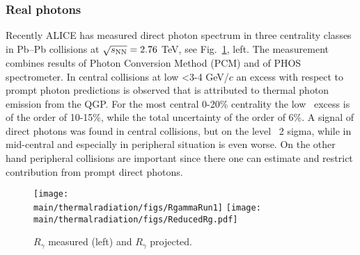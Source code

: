 \subsubsection{Real photons}

Recently ALICE has measured direct photon spectrum in three centrality classes in Pb--Pb collisions at $\sqrt{s_{\rm NN}}=2.76$ TeV, see Fig.\ \ref{fig:RealPhotonsRg}, left. The measurement combines results of Photon Conversion Method (PCM) and of PHOS spectrometer. In central collisions at low \pT<3-4 GeV/$c$ an excess with respect to prompt photon predictions is observed that is attributed to thermal photon emission from the QGP. For the most central 0-20\% centrality the low \pT \ excess is of the order of 10-15\%, while the total uncertainty of the order of 6\%. A signal of direct photons was found in central collisions, but on the level ~2 sigma, while in mid-central and especially in peripheral situation is even worse. On the other hand peripheral collisions are important since there one can estimate and restrict contribution from prompt direct photons.  

\begin{figure}[hbt]
\centering
\texttt{[image: \\main/thermalradiation/figs/RgammaRun1]}
\hfill
\texttt{[image: \\main/thermalradiation/figs/ReducedRg.pdf]}
\caption{$R_{\gamma}$ measured (left) and $R_{\gamma}$ projected.}
\label{fig:RealPhotonsRg}
\end{figure}

